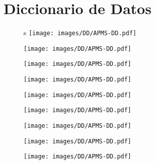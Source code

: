 \chapter{Diccionario de Datos}
\begin{figure}
	\begin{center}
    	s	\texttt{[image: images/DD/APMS-DD.pdf]}
	\end{center}
\end{figure}
\begin{figure}
	\begin{center}
    		\texttt{[image: images/DD/APMS-DD.pdf]}
	\end{center}
\end{figure}
\begin{figure}
	\begin{center}
    		\texttt{[image: images/DD/APMS-DD.pdf]}
	\end{center}
\end{figure}
\begin{figure}
	\begin{center}
    		\texttt{[image: images/DD/APMS-DD.pdf]}
	\end{center}
\end{figure}
\begin{figure}
	\begin{center}
    		\texttt{[image: images/DD/APMS-DD.pdf]}
	\end{center}
\end{figure}
\begin{figure}
	\begin{center}
    		\texttt{[image: images/DD/APMS-DD.pdf]}
	\end{center}
\end{figure}
\begin{figure}
	\begin{center}
    		\texttt{[image: images/DD/APMS-DD.pdf]}
	\end{center}
\end{figure}
\begin{figure}
	\begin{center}
    		\texttt{[image: images/DD/APMS-DD.pdf]}
	\end{center}
\end{figure}
\begin{figure}
	\begin{center}
    		\texttt{[image: images/DD/APMS-DD.pdf]}
	\end{center}
\end{figure}
